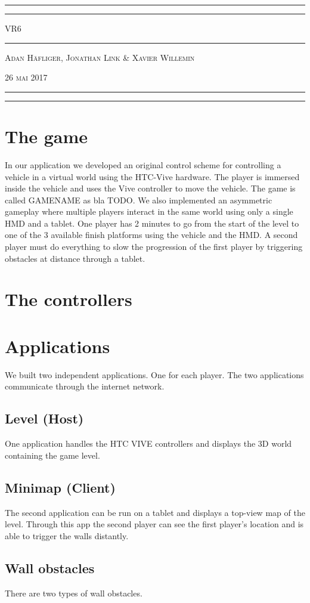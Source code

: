 \documentclass[12pt]{article}
\newcommand{\titleAT}{\begingroup %
\newlength{\drop} %
\drop=0.07\textheight %

\rule{\textwidth}{1pt}\par %
\vspace{2pt}\vspace{-\baselineskip} %
\rule{\textwidth}{0.4pt}\par %

\vspace{\drop} %
\centering %
{\Huge VR6}\\ %

\vspace{\drop} %
\rule{0.3\textwidth}{0.4pt}\par %
\vspace{\drop} %

{\large \textsc{Adan Häfliger, Jonathan Link \& Xavier Willemin}}\par %

\bigskip
\bigskip

{\small \textsc{26 mai 2017}}\par %

\vfill %

\begin{figure}[!h]
	\centering
\end{figure}

\bigskip

\rule{\textwidth}{0.4pt}\par %
\vspace{2pt}\vspace{-\baselineskip} %
\rule{\textwidth}{1pt}\par %

\thispagestyle{empty}

\endgroup}
\begin{document}
\titleAT

\newpage

\tableofcontents

\newpage

\section{The game}
In our application we developed an original control scheme for controlling a vehicle in a virtual world using the HTC-Vive hardware. The player is immersed inside the vehicle and uses the Vive controller to move the vehicle. The game is called GAMENAME as bla TODO. We also implemented an asymmetric gameplay where multiple players interact in the same world using only a single HMD and a tablet.
One player has 2 minutes to go from the start of the level to one of the 3 available finish platforms using the vehicle and the HMD. A second player must do everything to slow the progression of the first player by triggering obstacles at distance through a tablet.

\section{The controllers}


\section{Applications}
We built two independent applications. One for each player. The two applications communicate through the internet network.


\subsection{Level (Host)}
One application handles the HTC VIVE controllers and displays the 3D world containing the game level.

\subsection{Minimap (Client)}
The second application can be run on a tablet and displays a top-view map of the level. Through this app the second player can see the first player's location and is able to trigger the walls distantly.

\subsection{Wall obstacles}
There are two types of wall obstacles.
\end{document}
